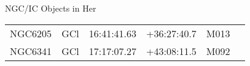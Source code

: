 \begin{block}{NGC/IC Objects in Her}
  \centering
  \begin{tabularx}{\textwidth}{llrrll} 
    NGC6205 & GCl & 16:41:41.63 & +36:27:40.7  & M013 \\ 
    NGC6341 & GCl & 17:17:07.27 & +43:08:11.5  & M092 \\ 
  \end{tabularx}
\end{block}
